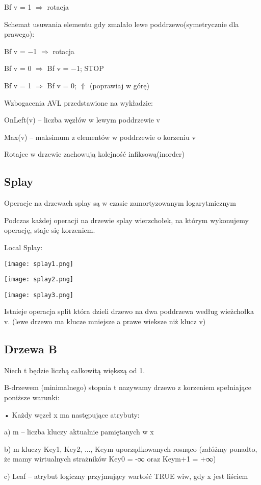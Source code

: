 Bf v = 1 $\Rightarrow$ rotacja

\entry
Schemat usuwania elementu gdy zmalało lewe poddrzewo(symetrycznie dla prawego):

Bf v = −1 $\Rightarrow$ rotacja

Bf v = 0 $\Rightarrow$ Bf v = −1; STOP

Bf v = 1 $\Rightarrow$ Bf v = 0; $\Uparrow$ (poprawiaj w górę)

\entry
Wzbogacenia AVL przedstawione na wykładzie:

OnLeft(v) – liczba węzłów w lewym poddrzewie v

Max(v) – maksimum z elementów w poddrzewie o korzeniu v

\entry
Rotajce w drzewie zachowują kolejność infiksową(inorder)

\subsection{Splay}
\entry
Operacje na drzewach splay są w czasie zamortyzowanym logarytmicznym

\entry
Podczas każdej operacji na drzewie splay wierzchołek, na którym wykonujemy operację, staje się korzeniem.

\entry
Local Splay:

\texttt{[image: splay1.png]}

\texttt{[image: splay2.png]}

\texttt{[image: splay3.png]}

\entry 
Istnieje operacja split która dzieli drzewo na dwa poddrzewa według wieżchołka v. (lewe drzewo ma klucze mniejsze a prawe wieksze niż klucz v)

\subsection{Drzewa B}
\entry
Niech t będzie liczbą całkowitą większą od 1.

B-drzewem (minimalnego) stopnia t nazywamy drzewo z korzeniem spełniające poniższe warunki:

• Każdy węzeł x ma następujące atrybuty:

a) m – liczba kluczy aktualnie pamiętanych w x

b) m kluczy Key1, Key2, ..., Keym uporządkowanych rosnąco (załóżmy ponadto, że mamy
wirtualnych strażników Key0 = -∞ oraz Keym+1 = +∞)

c) Leaf – atrybut logiczny przyjmujący wartość TRUE wiw, gdy x jest liściem

